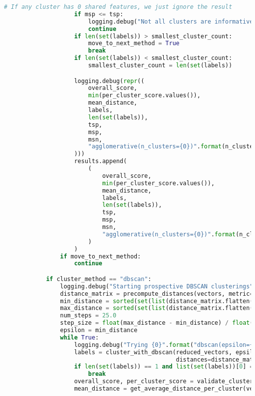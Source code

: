 \begin{lstlisting}[language=python]
                    # If any cluster has 0 shared features, we just ignore the result
                    if msp <= tsp:
                        logging.debug("Not all clusters are informative (a cluster has 0 shared features) ")
                        continue
                    if len(set(labels)) > smallest_cluster_count:
                        move_to_next_method = True
                        break
                    if len(set(labels)) < smallest_cluster_count:
                        smallest_cluster_count = len(set(labels))

                    logging.debug(repr((
                        overall_score,
                        min(per_cluster_score.values()),
                        mean_distance,
                        labels,
                        len(set(labels)),
                        tsp,
                        msp,
                        msn,
                        "agglomerative(n_clusters={0})".format(n_clusters)
                    )))
                    results.append(
                        (
                            overall_score,
                            min(per_cluster_score.values()),
                            mean_distance,
                            labels,
                            len(set(labels)),
                            tsp,
                            msp,
                            msn,
                            "agglomerative(n_clusters={0})".format(n_clusters)
                        )
                    )
                if move_to_next_method:
                    continue

            if cluster_method == "dbscan":
                logging.debug("Starting prospective DBSCAN clusterings")
                distance_matrix = precompute_distances(vectors, metric=metric)
                min_distance = sorted(set(list(distance_matrix.flatten())))[1]
                max_distance = sorted(set(list(distance_matrix.flatten())))[-1]
                num_steps = 25.0
                step_size = float(max_distance - min_distance) / float(num_steps)
                epsilon = min_distance
                while True:
                    logging.debug("Trying {0}".format("dbscan(epsilon={0})".format(epsilon)))
                    labels = cluster_with_dbscan(reduced_vectors, epsilon=epsilon, min_samples=1,
                                                 distances=distance_matrix)
                    if len(set(labels)) == 1 and list(set(labels))[0] == 0:
                        break
                    overall_score, per_cluster_score = validate_clusters(vectors, labels)
                    mean_distance = get_average_distance_per_cluster(vectors, labels)[0]


\end{lstlisting}
